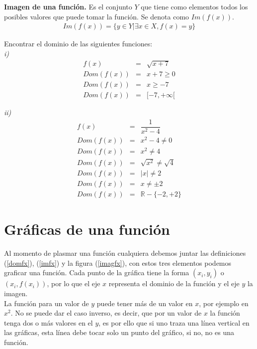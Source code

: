 \begin{mydef}
\textbf{Imagen de una función.} Es el conjunto $Y$ que tiene como elementos todos los posibles valores que puede tomar la función. Se denota como $Im(f(x))$.
\begin{eqnarray}
Im(f(x))=\{y\in Y|\exists x\in X,f(x)=y \}
\end{eqnarray}
\label{imfx}
\end{mydef}

\begin{myexample} Encontrar el dominio de las siguientes funciones:\\

\noindent\textit{i)}
\begin{eqnarray*}
f(x)&=&\sqrt{x+7}\\
Dom(f(x))&=& x+7\geq 0\\
Dom(f(x))&=& x\geq -7\\
Dom(f(x))&=& [-7,+\infty [
\end{eqnarray*}

\noindent\textit{ii)}
\begin{eqnarray*}
f(x)&=&\dfrac{1}{x^{2}-4}\\
Dom(f(x))&=& x^{2}-4\neq 0 \\
Dom(f(x))&=& x^{2}\neq 4 \\
Dom(f(x))&=& \sqrt{x^{2}}\neq \sqrt{4} \\
Dom(f(x))&=& |x|\neq 2 \\
Dom(f(x))&=& x\neq \pm 2 \\
Dom(f(x))&=& \mathbb{R}-\{-2,+2\}
\end{eqnarray*}
\end{myexample}

\section{Gráficas de una función}
Al momento de plasmar una función cualquiera debemos juntar las definiciones (\ref{domfx}), (\ref{imfx}) y la figura (\ref{imagfx}), con estos tres elementos podemos graficar una función. Cada punto de la gráfica tiene la forma $(x_{i},y_{i})$ o $(x_{i},f(x_{i}))$, por lo que el eje $x$ representa el dominio de la función y el eje $y$ la imagen. \\
La función para un valor de $y$ puede tener más de un valor en $x$, por ejemplo en $x^{2}$. No se puede dar el caso inverso, es decir, que por un valor de $x$ la función tenga dos o más valores en el $y$, es por ello que si uno traza una línea vertical en las gráficas, esta línea debe tocar solo un punto del gráfico, si no, no es una función.\\

